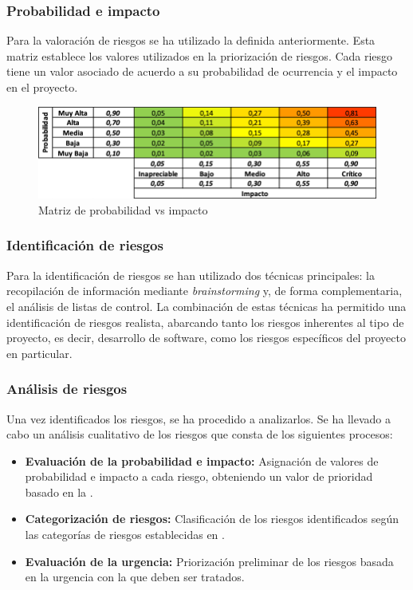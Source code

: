 \subsubsection*{Probabilidad e impacto}
Para la valoración de riesgos se ha utilizado la  definida anteriormente. 
Esta matriz establece los valores utilizados en la priorización de riesgos. Cada riesgo tiene un valor asociado de acuerdo a su probabilidad de ocurrencia y el impacto en el proyecto.

\begin{figure}[H]
    \hypertarget{fig:A1_PGR_matriz_prob_vs_impact}{}
    \centering
    \includegraphics{figures/A1_PGR_matriz_prob_vs_impact.png}
    \caption{Matriz de probabilidad vs impacto}
    \label{fig:A1_PGR_matriz_prob_vs_impact}
\end{figure}

\subsubsection*{Identificación de riesgos}
Para la identificación de riesgos se han utilizado dos técnicas principales: la recopilación de información mediante \textit{brainstorming} y, de forma complementaria, el análisis de listas de control. La combinación de estas técnicas ha permitido una identificación de riesgos realista, abarcando tanto los riesgos inherentes al tipo de proyecto, es decir, desarrollo de software, como los riesgos específicos del proyecto en particular.

\subsubsection*{Análisis de riesgos}
Una vez identificados los riesgos, se ha procedido a analizarlos. Se ha llevado a cabo un análisis cualitativo de los riesgos que consta de los siguientes procesos:
\begin{itemize}
    \item \textbf{Evaluación de la probabilidad e impacto:} Asignación de valores de probabilidad e impacto a cada riesgo, obteniendo un valor de prioridad basado en la .
    \item \textbf{Categorización de riesgos:} Clasificación de los riesgos identificados según las categorías de riesgos establecidas en  .
    \item \textbf{Evaluación de la urgencia:} Priorización preliminar de los riesgos basada en la urgencia con la que deben ser tratados.
\end{itemize}



